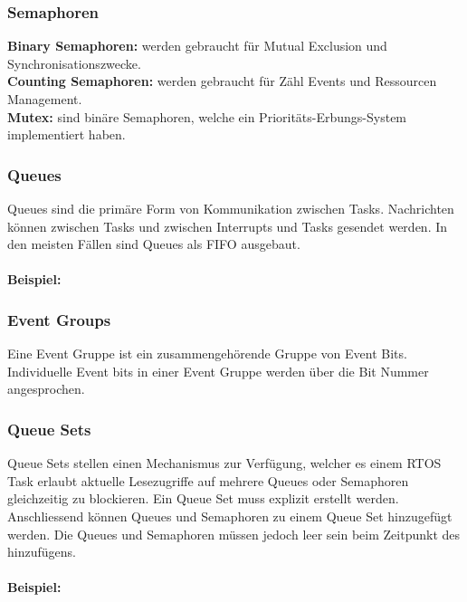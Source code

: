 \subsubsection{Semaphoren}
\textbf{Binary Semaphoren:} werden gebraucht für Mutual Exclusion und Synchronisationszwecke. \\
\textbf{Counting Semaphoren:} werden gebraucht für Zähl Events und Ressourcen Management. \\
\textbf{Mutex:} sind binäre Semaphoren, welche ein Prioritäts-Erbungs-System implementiert haben.

\subsubsection{Queues}
Queues sind die primäre Form von Kommunikation zwischen Tasks. Nachrichten können zwischen Tasks und zwischen Interrupts und Tasks gesendet werden. In den meisten Fällen sind Queues als FIFO ausgebaut. \\ \\
\textbf{Beispiel:}


\subsubsection{Event Groups}
Eine Event Gruppe ist ein zusammengehörende Gruppe von Event Bits. Individuelle Event bits in einer Event Gruppe werden über die Bit Nummer angesprochen.

\subsubsection{Queue Sets}
Queue Sets stellen einen Mechanismus zur Verfügung, welcher es einem RTOS Task erlaubt aktuelle Lesezugriffe auf mehrere Queues oder Semaphoren gleichzeitig zu blockieren. Ein Queue Set muss explizit erstellt werden. Anschliessend können Queues und Semaphoren zu einem Queue Set hinzugefügt werden. Die Queues und Semaphoren müssen jedoch leer sein beim Zeitpunkt des hinzufügens. \\ \\
\textbf{Beispiel:}


